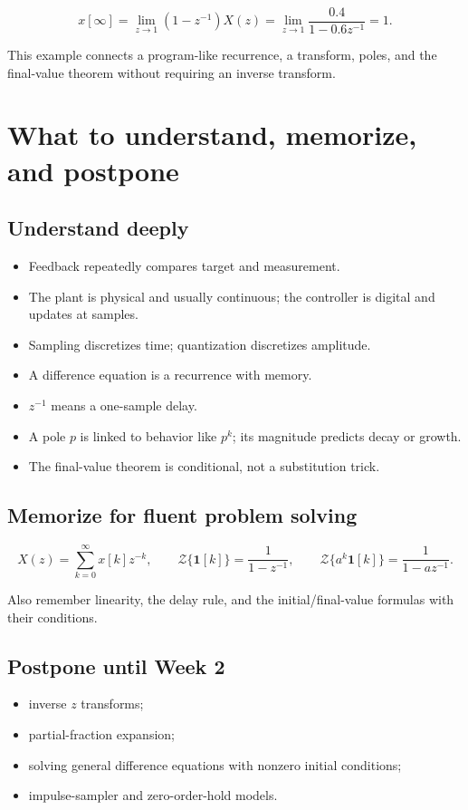 \documentclass[11pt]{article}
\newcommand{\Z}{\mathcal{Z}}
\newcommand{\unitstep}{\mathbf{1}}
\begin{document}
\[
x[\infty]
=\lim_{z\to1}(1-z^{-1})X(z)
=\lim_{z\to1}\frac{0.4}{1-0.6z^{-1}}
=1.
\]

This example connects a program-like recurrence, a transform, poles, and the final-value theorem without requiring an inverse transform.

\section{What to understand, memorize, and postpone}

\subsection{Understand deeply}

\begin{itemize}
  \item Feedback repeatedly compares target and measurement.
  \item The plant is physical and usually continuous; the controller is digital and updates at samples.
  \item Sampling discretizes time; quantization discretizes amplitude.
  \item A difference equation is a recurrence with memory.
  \item $z^{-1}$ means a one-sample delay.
  \item A pole $p$ is linked to behavior like $p^k$; its magnitude predicts decay or growth.
  \item The final-value theorem is conditional, not a substitution trick.
\end{itemize}

\subsection{Memorize for fluent problem solving}

\[
X(z)=\sum_{k=0}^{\infty}x[k]z^{-k},\qquad
\Z\{\unitstep[k]\}=\frac{1}{1-z^{-1}},\qquad
\Z\{a^k\unitstep[k]\}=\frac{1}{1-az^{-1}}.
\]

Also remember linearity, the delay rule, and the initial/final-value formulas with their conditions.

\subsection{Postpone until Week 2}

\begin{itemize}
  \item inverse $z$ transforms;
  \item partial-fraction expansion;
  \item solving general difference equations with nonzero initial conditions;
  \item impulse-sampler and zero-order-hold models.
\end{itemize}
\end{document}
